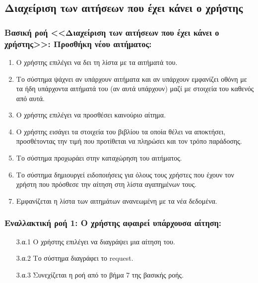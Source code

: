 \documentclass[12pt,a4paper]{article}
\begin{document}
\subsection{Διαχείριση των αιτήσεων που έχει κάνει ο χρήστης}

\subsubsection*{Βασική ροή <<Διαχείριση των αιτήσεων που έχει κάνει ο χρήστης>>: Προσθήκη νέου αιτήματος:}
\begin{enumerate}
    \item Ο χρήστης επιλέγει να δει τη λίστα με τα αιτήματά του. 
    \item Το σύστημα ψάχνει αν υπάρχουν αιτήματα και αν υπάρχουν εμφανίζει οθόνη με τα ήδη υπάρχοντα αιτήματά του (αν αυτά υπάρχουν) μαζί με στοιχεία του καθενός από αυτά. 
    \item Ο χρήστης επιλέγει να προσθέσει καινούριο αίτημα.
    \item Ο χρήστης εισάγει τα στοιχεία του βιβλίου τα οποία θέλει να αποκτήσει, προσθέτοντας την τιμή που προτίθεται να πληρώσει και τον τρόπο παράδοσης. 
    \item Το σύστημα προχωράει στην καταχώρηση του αιτήματος. 
    \item Το σύστημα δημιουργεί ειδοποιήσεις για όλους τους χρήστες που έχουν τον χρήστη που πρόσθεσε την αίτηση στη λίστα αγαπημένων τους. 
    \item Εμφανίζεται η λίστα των αιτημάτων ανανεωμένη με τα νέα δεδομένα.
\end{enumerate}

\subsubsection*{Εναλλακτική ροή 1: Ο χρήστης αφαιρεί υπάρχουσα αίτηση:}
\begin{enumerate}
    \item[3.α.1] Ο χρήστης επιλέγει να διαγράψει μια αίτηση του.
    \item[3.α.2] Το σύστημα διαγράφει το request.
    \item[3.α.3] Συνεχίζεται η ροή από το βήμα 7 της βασικής ροής.
\end{enumerate}
\end{document}
